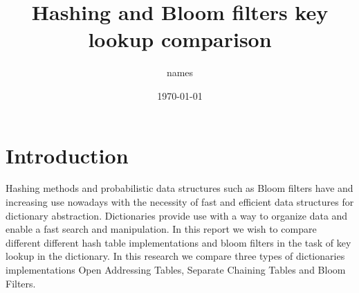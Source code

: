 \documentclass{article}
\title{Hashing and Bloom filters key lookup comparison}
\author{names}
\date{\today}
\begin{document}
    \maketitle
    \thispagestyle{empty}
    \begin{abstract}

    \end{abstract}


    \section{Introduction}
        Hashing methods and probabilistic data structures such as Bloom filters have and increasing use nowadays with the necessity of 
        fast and efficient data structures for dictionary abstraction. Dictionaries provide use with a way to organize data and enable 
        a fast search and manipulation. In this report we wish to compare different different hash table implementations and bloom filters 
        in the task of key lookup in the dictionary. In this research we compare three types of dictionaries implementations Open Addressing Tables, 
   	Separate Chaining Tables and Bloom Filters. 
\end{document}
